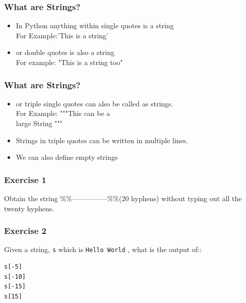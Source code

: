 \documentclass[17pt]{beamer}
\begin{document}
\begin{frame}
\frametitle{What are Strings?}\pause
\begin{itemize}
\item In Python anything within single quotes is a string\\For Example:'This is a string'
\item or double quotes is also a string\\For example:  "This is a string too"
\end{itemize}
\end{frame}
\begin{frame}
\frametitle{What are Strings?}\pause
\begin{itemize}
\item or triple single quotes can also be called as strings.\\For Example: """This can be a\\
            \hspace{30pt} large  String  """ \pause
\item Strings in triple quotes can be written in multiple lines. \pause
\item We can also define empty strings
\end{itemize}
\end{frame}
\begin{frame}
\frametitle{Exercise 1}
\label{sec-3}
 {\text Obtain the string \%\%---------------\%\%(20 hyphens) without
  typing out all the twenty hyphens.}
\end{frame}
\begin{frame}[fragile]
\frametitle{Exercise 2}
\label{sec-4}

  Given a string, \verb~s~ which is \verb~Hello World~ , what is the output of::
\lstset{language=Python}
\begin{lstlisting}
s[-5] 
s[-10]
s[-15]
s[15]
\end{lstlisting}
\end{frame}
\end{document}
